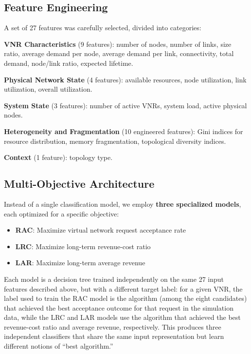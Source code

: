 \documentclass[runningheads]{llncs}
\begin{document}
\subsection{Feature Engineering}

A set of 27 features was carefully selected, divided into categories:

\medskip
\noindent\textbf{VNR Characteristics} (9 features): number of nodes, number of links, size ratio, average demand per node, average demand per link, connectivity, total demand, node/link ratio, expected lifetime.

\noindent\textbf{Physical Network State} (4 features): available resources, node utilization, link utilization, overall utilization.

\noindent\textbf{System State} (3 features): number of active VNRs, system load, active physical nodes.

\noindent\textbf{Heterogeneity and Fragmentation} (10 engineered features): Gini indices for resource distribution, memory fragmentation, topological diversity indices.

\noindent\textbf{Context} (1 feature): topology type.

\subsection{Multi-Objective Architecture}

Instead of a single classification model, we employ \textbf{three specialized models}, each optimized for a specific objective:

\begin{itemize}
    \item \textbf{RAC}: Maximize virtual network request acceptance rate
    \item \textbf{LRC}: Maximize long-term revenue-cost ratio
    \item \textbf{LAR}: Maximize long-term average revenue
\end{itemize}

Each model is a decision tree trained independently on the same 27 input features described above, but with a different target label: for a given VNR, the label used to train the RAC model is the algorithm (among the eight candidates) that achieved the best acceptance outcome for that request in the simulation data, while the LRC and LAR models use the algorithm that achieved the best revenue-cost ratio and average revenue, respectively. This produces three independent classifiers that share the same input representation but learn different notions of ``best algorithm.''
\end{document}

